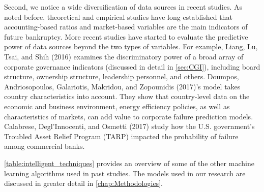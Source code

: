 Second, we notice a wide diversification of data sources in recent studies. As noted before, theoretical and empirical studies have long established that accounting-based ratios and market-based variables are the main indicators of future bankruptcy. More recent studies have started to evaluate the predictive power of data sources beyond the two types of variables. For example, Liang, Lu, Tsai, and Shih (2016)  \cite{liang2016financial} examines the discriminatory power of a broad array of corporate governance indicators (discussed in detail in \autoref{sec:CGI}), including board structure, ownership structure, leadership personnel, and others. Doumpos, Andriosopoulos, Galariotis, Makridou, and Zopounidis (2017)’s model \cite{doumpos2017corporate} takes country characteristics into account. They show that country-level data on the economic and business environment, energy efficiency policies, as well as characteristics of markets, can add value to corporate failure prediction models. Calabrese, Degl'Innocenti, and Osmetti (2017) \cite{calabrese2017effectiveness} study how the U.S. government's Troubled Asset Relief Program (TARP) impacted the probability of failure among commercial banks. 


\autoref{table:intelligent_techniques} provides an overview of some of the other machine learning algorithms used in past studies. The models used in our research are discussed in greater detail in \autoref{chap:Methodologies}.

